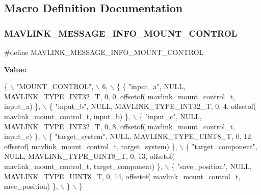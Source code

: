 \subsection{Macro Definition Documentation}
\mbox{\label{mavlink__msg__mount__control_8h_aedb0b9b54ce59906827bb153ccebef89}} 
\subsubsection{M\+A\+V\+L\+I\+N\+K\+\_\+\+M\+E\+S\+S\+A\+G\+E\+\_\+\+I\+N\+F\+O\+\_\+\+M\+O\+U\+N\+T\+\_\+\+C\+O\+N\+T\+R\+OL}
{\footnotesize\ttfamily \#define M\+A\+V\+L\+I\+N\+K\+\_\+\+M\+E\+S\+S\+A\+G\+E\+\_\+\+I\+N\+F\+O\+\_\+\+M\+O\+U\+N\+T\+\_\+\+C\+O\+N\+T\+R\+OL}

{\bfseries Value\+:}
\begin{DoxyCode}
\{ \(\backslash\)
    \textcolor{stringliteral}{"MOUNT\_CONTROL"}, \(\backslash\)
    6, \(\backslash\)
    \{  \{ \textcolor{stringliteral}{"input\_a"}, NULL, MAVLINK_TYPE_INT32_T, 0, 0, offsetof(
      mavlink_mount_control_t, input\_a) \}, \(\backslash\)
         \{ \textcolor{stringliteral}{"input\_b"}, NULL, MAVLINK_TYPE_INT32_T, 0, 4, offsetof(
      mavlink_mount_control_t, input\_b) \}, \(\backslash\)
         \{ \textcolor{stringliteral}{"input\_c"}, NULL, MAVLINK_TYPE_INT32_T, 0, 8, offsetof(
      mavlink_mount_control_t, input\_c) \}, \(\backslash\)
         \{ \textcolor{stringliteral}{"target\_system"}, NULL, MAVLINK_TYPE_UINT8_T, 0, 12, offsetof(
      mavlink_mount_control_t, target\_system) \}, \(\backslash\)
         \{ \textcolor{stringliteral}{"target\_component"}, NULL, MAVLINK_TYPE_UINT8_T, 0, 13, offsetof(
      mavlink_mount_control_t, target\_component) \}, \(\backslash\)
         \{ \textcolor{stringliteral}{"save\_position"}, NULL, MAVLINK_TYPE_UINT8_T, 0, 14, offsetof(
      mavlink_mount_control_t, save\_position) \}, \(\backslash\)
         \} \(\backslash\)
\}
\end{DoxyCode}
\mbox{\label{mavlink__msg__mount__control_8h_addce385fb29c735667ec9894587ec435}} 
